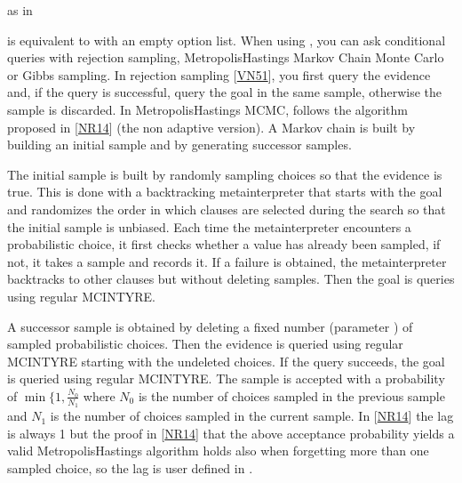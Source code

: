 \documentclass[letterpaper,10pt,english]{sphinxmanual}
\begin{document}
\sphinxAtStartPar
as in

\begin{sphinxVerbatim}[commandchars=\\\{\}]
 \PYG{p}{[}
\end{sphinxVerbatim}

\sphinxAtStartPar
{} is equivalent to  with an empty option list.
When using , you can ask conditional queries with rejection sampling,
Metropolis\sphinxhyphen{}Hastings Markov Chain Monte Carlo or Gibbs sampling.
In rejection sampling {[}\hyperlink{cite.index:id55}{VN51}{]}, you first query the evidence and, if the query is successful, query the goal in the same sample, otherwise the sample is discarded.
In Metropolis\sphinxhyphen{}Hastings MCMC,  follows the algorithm proposed in {[}\hyperlink{cite.index:id56}{NR14}{]} (the non adaptive version).
A Markov chain is built by building an initial sample and by generating successor samples.

\sphinxAtStartPar
The initial sample is built by randomly sampling choices so that the evidence is true.
This is done with a backtracking meta\sphinxhyphen{}interpreter that starts with the goal and randomizes the order in which clauses are selected during the search so that the initial sample is unbiased.
Each time the meta\sphinxhyphen{}interpreter encounters a probabilistic choice, it first checks whether a value has already been sampled, if not, it takes a sample and records it.
If a failure is obtained, the meta\sphinxhyphen{}interpreter backtracks to other clauses but without deleting samples. Then the goal is queries using regular MCINTYRE.

\sphinxAtStartPar
A successor sample is obtained by deleting a fixed number (parameter ) of sampled probabilistic choices.
Then the evidence is queried using regular MCINTYRE starting with the undeleted choices.
If the query succeeds, the goal is queried using regular MCINTYRE.
The sample is accepted with a probability of \(\min\{1,\frac{N_0}{N_1}\) where \(N_0\) is the number of choices sampled in the previous sample and \(N_1\) is the number of choices sampled in the current sample.
In {[}\hyperlink{cite.index:id56}{NR14}{]} the lag is always 1 but the proof in {[}\hyperlink{cite.index:id56}{NR14}{]} that the above acceptance probability yields a valid Metropolis\sphinxhyphen{}Hastings algorithm holds also when forgetting more than one sampled choice, so the lag is user defined in .
\end{document}
